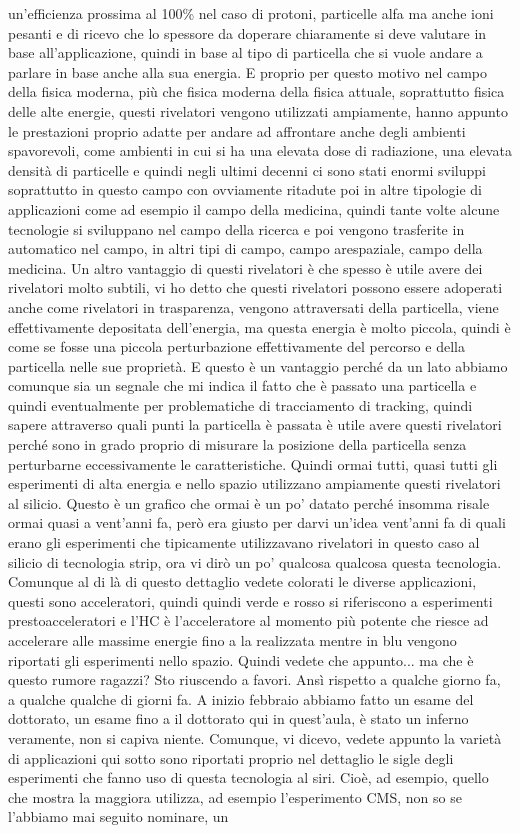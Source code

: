 un'efficienza prossima al 100\% nel caso di protoni, particelle alfa ma anche ioni pesanti e di ricevo che lo spessore da doperare chiaramente si deve valutare in base all'applicazione, quindi in base al tipo di particella che si vuole andare a parlare in base anche alla sua energia. E proprio per questo motivo nel campo della fisica moderna, più che fisica moderna della fisica attuale, soprattutto fisica delle alte energie, questi rivelatori vengono utilizzati ampiamente, hanno appunto le prestazioni proprio adatte per andare ad affrontare anche degli ambienti spavorevoli, come ambienti in cui si ha una elevata dose di radiazione, una elevata densità di particelle e quindi negli ultimi decenni ci sono stati enormi sviluppi soprattutto in questo campo con ovviamente ritadute poi in altre tipologie di applicazioni come ad esempio il campo della medicina, quindi tante volte alcune tecnologie si sviluppano nel campo della ricerca e poi vengono trasferite in automatico nel campo, in altri tipi di campo, campo arespaziale, campo della medicina. Un altro vantaggio di questi rivelatori è che spesso è utile avere dei rivelatori molto subtili, vi ho detto che questi rivelatori possono essere adoperati anche come rivelatori in trasparenza, vengono attraversati della particella, viene effettivamente depositata dell'energia, ma questa energia è molto piccola, quindi è come se fosse una piccola perturbazione effettivamente del percorso e della particella nelle sue proprietà. E questo è un vantaggio perché da un lato abbiamo comunque sia un segnale che mi indica il fatto che è passato una particella e quindi eventualmente per problematiche di tracciamento di tracking, quindi sapere attraverso quali punti la particella è passata è utile avere questi rivelatori perché sono in grado proprio di misurare la posizione della particella senza perturbarne eccessivamente le caratteristiche. Quindi ormai tutti, quasi tutti gli esperimenti di alta energia e nello spazio utilizzano ampiamente questi rivelatori al silicio. Questo è un grafico che ormai è un po' datato perché insomma risale ormai quasi a vent'anni fa, però era giusto per darvi un'idea vent'anni fa di quali erano gli esperimenti che tipicamente utilizzavano rivelatori in questo caso al silicio di tecnologia strip, ora vi dirò un po' qualcosa qualcosa questa tecnologia. Comunque al di là di questo dettaglio vedete colorati le diverse applicazioni, questi sono acceleratori, quindi quindi verde e rosso si riferiscono a esperimenti prestoacceleratori e l'HC è l'acceleratore al momento più potente che riesce ad accelerare alle massime energie fino a la realizzata mentre in blu vengono riportati gli esperimenti nello spazio. Quindi vedete che appunto... ma che è questo rumore ragazzi? Sto riuscendo a favori. Ansì rispetto a qualche giorno fa, a qualche qualche di giorni fa. A inizio febbraio abbiamo fatto un esame del dottorato, un esame fino a il dottorato qui in quest'aula, è stato un inferno veramente, non si capiva niente. Comunque, vi dicevo, vedete appunto la varietà di applicazioni qui sotto sono riportati proprio nel dettaglio le sigle degli esperimenti che fanno uso di questa tecnologia al siri. Cioè, ad esempio, quello che mostra la maggiora utilizza, ad esempio l'esperimento CMS, non so se l'abbiamo mai seguito nominare, un 